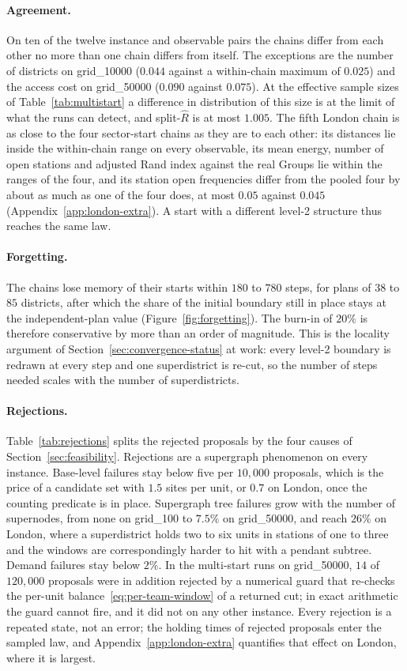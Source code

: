 \documentclass[11pt]{article}
\theoremstyle{definition}
\begin{document}
\paragraph{Agreement.}
On ten of the twelve instance and observable pairs the chains differ from each other no more than one chain differs from itself. The exceptions are the number of districts on grid\_10000 ($0.044$ against a within-chain maximum of $0.025$) and the access cost on grid\_50000 ($0.090$ against $0.075$). At the effective sample sizes of Table~\ref{tab:multistart} a difference in distribution of this size is at the limit of what the runs can detect, and split-$\hat R$ is at most $1.005$. The fifth London chain is as close to the four sector-start chains as they are to each other: its distances lie inside the within-chain range on every observable, its mean energy, number of open stations and adjusted Rand index against the real Groups lie within the ranges of the four, and its station open frequencies differ from the pooled four by about as much as one of the four does, at most $0.05$ against $0.045$ (Appendix~\ref{app:london-extra}). A start with a different level-2 structure thus reaches the same law.

\paragraph{Forgetting.}
The chains lose memory of their starts within $180$ to $780$ steps, for plans of $38$ to $85$ districts, after which the share of the initial boundary still in place stays at the independent-plan value (Figure~\ref{fig:forgetting}). The burn-in of $20\%$ is therefore conservative by more than an order of magnitude. This is the locality argument of Section~\ref{sec:convergence-status} at work: every level-2 boundary is redrawn at every step and one superdistrict is re-cut, so the number of steps needed scales with the number of superdistricts.

\paragraph{Rejections.}
Table~\ref{tab:rejections} splits the rejected proposals by the four causes of Section~\ref{sec:feasibility}. Rejections are a supergraph phenomenon on every instance. Base-level failures stay below five per $10{,}000$ proposals, which is the price of a candidate set with $1.5$ sites per unit, or $0.7$ on London, once the counting predicate is in place. Supergraph tree failures grow with the number of supernodes, from none on grid\_100 to $7.5\%$ on grid\_50000, and reach $26\%$ on London, where a superdistrict holds two to six units in stations of one to three and the windows are correspondingly harder to hit with a pendant subtree. Demand failures stay below $2\%$. In the multi-start runs on grid\_50000, $14$ of $120{,}000$ proposals were in addition rejected by a numerical guard that re-checks the per-unit balance~\eqref{eq:per-team-window} of a returned cut; in exact arithmetic the guard cannot fire, and it did not on any other instance. Every rejection is a repeated state, not an error; the holding times of rejected proposals enter the sampled law, and Appendix~\ref{app:london-extra} quantifies that effect on London, where it is largest.
\end{document}
